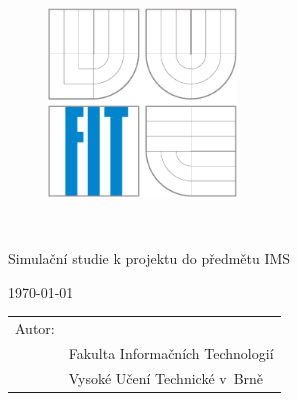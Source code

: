 \begin{titlepage}

\begin{figure}[!h]
  \centering
  \includegraphics[height=5cm]{img/logo.eps}
\end{figure}

\vfill

\begin{center}
  \bigskip
  \begin{Huge}
  \projname\\
  \end{Huge}
  \begin{large}
  Simulační studie k projektu do předmětu IMS\\
  \end{large}
\end{center}

\vfill

\begin{center}
  \begin{Large}
  \today
  \end{Large}
\end{center}

\vfill

\begin{flushleft}
\begin{large}
\begin{tabular}{ll}
Autor: & \author \\
 & Fakulta Informačních Technologií \\
 & Vysoké Učení Technické v~Brně \\
\end{tabular}
\end{large}
\end{flushleft}
\end{titlepage}
